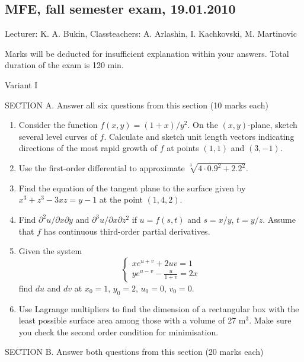 \subsection{MFE, fall semester exam, 19.01.2010}

Lecturer: K. A. Bukin, Classteachers: A. Arlashin, I. Kachkovski, M. Martinovic


Marks will be deducted for insufficient explanation within your answers. Total duration
of the exam is 120 min.


Variant I


SECTION A. Answer all six questions from this section (10 marks each)

\begin{enumerate}

\item Consider the function $f(x,y)=(1+x)/y^2$. On the $(x,y)$-plane, sketch several level curves of $f$. Calculate and sketch unit length vectors indicating directions of the most rapid growth of $f$ at points $(1, 1)$ and $(3, -1)$.

\item Use the first-order differential to approximate
$\sqrt[3]{4\cdot 0.9^2+2.2^2}$.

\item Find the equation of the tangent plane to the surface given by $x^3+z^3-3xz=y-1$ at the point $(1, 4, 2)$.

\item Find $\partial^2 u / \partial x \partial y$ and $\partial^3 u / \partial x \partial z^2$ if $u=f(s,t)$ and $s=x/y$, $t=y/z$. Assume that $f$ has continuous third-order partial derivatives.

\item Given the system
\[
\begin{cases}
xe^{u+v}+2uv=1 \\
ye^{u-v}-\frac{u}{1+v}=2x
\end{cases}
\]
find $du$ and $dv$ at $x_0 = 1$, $y_0 = 2$, $u_0 = 0$, $v_0 = 0$.

\item Use Lagrange multipliers to find the dimension of a rectangular box with the least
possible surface area among those with a volume of 27 m$^3$. Make sure you check the second
order condition for minimisation.
\end{enumerate}

SECTION B. Answer both questions from this section (20 marks each)

